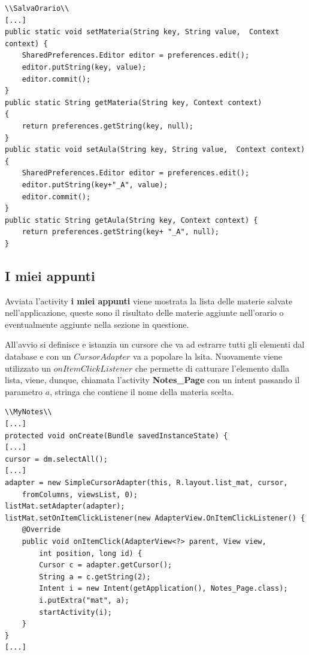 \documentclass[a4paper, 50pt, twoside]{article}
\begin{document}
\begin{lstlisting}
\\SalvaOrario\\
[...]
public static void setMateria(String key, String value,  Context context) {
	SharedPreferences.Editor editor = preferences.edit();
	editor.putString(key, value);
	editor.commit();
}
public static String getMateria(String key, Context context)
{
	return preferences.getString(key, null);
}
public static void setAula(String key, String value,  Context context) {
	SharedPreferences.Editor editor = preferences.edit();
	editor.putString(key+"_A", value);
	editor.commit();
}
public static String getAula(String key, Context context) {
	return preferences.getString(key+ "_A", null);
}
\end{lstlisting}

\newpage
\subsection{I miei appunti}
Avviata l'activity \textbf{i miei appunti} viene mostrata la lista delle materie salvate nell'applicazione, queste sono il risultato delle materie aggiunte nell'orario o eventualmente aggiunte nella sezione in questione.

All'avvio si definisce e istanzia un cursore che va ad estrarre tutti gli elementi dal database e con un $CursorAdapter$ va a popolare la lsita. Nuovamente viene utilizzato un $onItemClickListener$ che permette di catturare l'elemento dalla lista, viene, dunque, chiamata l'activity \textbf{Notes\_Page} con un intent passando il parametro $a$, stringa che contiene il nome della materia scelta.

\begin{lstlisting}
\\MyNotes\\
[...]
protected void onCreate(Bundle savedInstanceState) {
[...]
cursor = dm.selectAll();
[...]
adapter = new SimpleCursorAdapter(this, R.layout.list_mat, cursor, 
	fromColumns, viewsList, 0);
listMat.setAdapter(adapter);
listMat.setOnItemClickListener(new AdapterView.OnItemClickListener() {
	@Override
	public void onItemClick(AdapterView<?> parent, View view, 
		int position, long id) {
		Cursor c = adapter.getCursor();
		String a = c.getString(2);
		Intent i = new Intent(getApplication(), Notes_Page.class);
		i.putExtra("mat", a);
		startActivity(i);
	}
}
[...]
\end{lstlisting}
\end{document}
